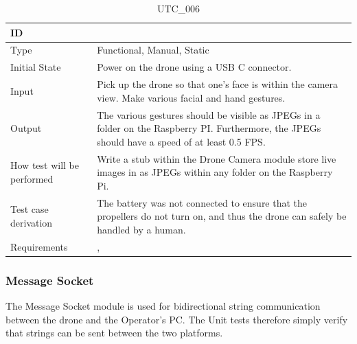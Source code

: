 \documentclass[12pt, titlepage]{article}
\begin{document}
\begin{table}[!h]
\begin{center}
\caption {UTC\_006}
\label{tab:UTC_006}
\begin{tabular}{ | m{3.2cm} | m{12.2cm} | } 
\hline
ID & \nameref{tab:UTC_006} \\ 
\hline
Type &  Functional, Manual, Static  \\ 
\hline
Initial State &  Power on the drone using a USB C connector. \\ 
\hline
Input & Pick up the drone so that one's face is within the camera view. Make various facial and hand gestures.\\ 
\hline
Output &  The various gestures should be visible as JPEGs in a folder on the Raspberry PI. Furthermore, the JPEGs should have a speed of at least 0.5 FPS.\\ 
\hline
How test will be performed & Write a stub within the Drone Camera module store live images in as JPEGs within any folder on the Raspberry Pi. \\ 
\hline
Test case derivation &  The battery was not connected to ensure that the propellers do not turn on, and thus the drone can safely be handled by a human. \\ 
\hline
Requirements & \nameref{GEN_002}, \nameref{PERF_004} \\ 
\hline
\end{tabular}
\end{center}
\end{table}

\clearpage

\subsubsection{Message Socket}

The Message Socket module is used for bidirectional string communication between the drone and the Operator's PC. The Unit tests therefore simply verify that strings can be sent between the two platforms. 
\end{document}
